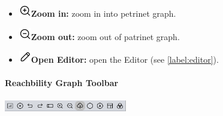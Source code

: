 \documentclass[10pt, a4paper]{article}
\begin{document}
\begin{itemize}
\item\includegraphics[scale=0.4]{../resources/images/Toolbar/zoom-in.png}\hspace{0.1cm}\textbf{Zoom in:} zoom in into petrinet graph.
\item\includegraphics[scale=0.4]{../resources/images/Toolbar/zoom-out.png}\hspace{0.1cm}\textbf{Zoom out:} zoom out of patrinet graph.
\item\includegraphics[scale=0.4]{../resources/images/Toolbar/edit.png}\hspace{0.1cm}\textbf{Open Editor:} open the Editor (see \ref{label:editor}).
\end{itemize}

\paragraph{Reachbility Graph Toolbar}

\includegraphics[height=0.5cm]{Viewer_Reachability_Toolbar.png}
\end{document}
